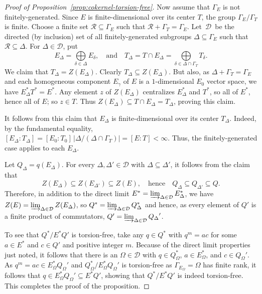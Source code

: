 \documentclass[11pt]{article}
\numberwithin{equation}{section}
\theoremstyle{plain}
\theoremstyle{remark}
\begin{document}
\begin{proof}[Proof of Proposition~\ref{prop:cokernel-torsion-free}]
Now assume that $\Gamma_E$ is not finitely-generated. Since $E$ is finite-dimensional over its center $T$, the group 
$\Gamma_E/\Gamma_T$ is finite.  Choose a finite set $\mathcal R\subseteq \Gamma_E$  such that 
$\mathcal R + \Gamma_T = \Gamma_E$.  Let~$\mathcal D$~be the directed  (by inclusion) set of all 
finitely-generated subgroups $\Delta\subseteq \Gamma_E$ such that $\mathcal R\subseteq \Delta$.  For 
$\Delta\in\mathcal D$, put
$$
        E_\Delta=\underset{\delta\in\Delta}{\textstyle{\bigoplus}} E_\delta,\quad\text{and}\quad
        T_\Delta=T\cap E_\Delta=\underset{\delta\in\Delta\cap\Gamma_T}{\textstyle{\bigoplus}} T_\delta.
$$
We claim that $T_\Delta = Z(E_\Delta)$.  Clearly $T_\Delta \subseteq  Z(E_\Delta)$.  But also, as 
$\Delta + \Gamma_T= \Gamma_E$ and each homogeneous component $E_\gamma$ of $E$ is a $1$-dimensional 
$E_0$ vector space, we have $E_\Delta^*T^* = E^*$.  Any element $z$ of $Z(E_\Delta)$ centralizes $E_\Delta^*$ and 
$T^*$, so all of $E^*$, hence all of $E$; so $z\in T$.  Thus $Z(E_\Delta) \subseteq T \cap E_\Delta = T_\Delta$, 
proving this claim.

It follows from this claim that $E_\Delta$ is finite-dimensional over its center $T_\Delta$.  Indeed, by the fundamental 
equality, $[E_\Delta:T_\Delta]=[E_0:T_0]\,|\Delta/(\Delta\cap\Gamma_T)| = [E:T]< \infty$.   Thus, the finitely-generated 
case applies to each $E_\Delta$.

Let $Q_\Delta = q(E_\Delta)$.   For every $\Delta, \Delta' \in \mathcal D$ with $\Delta \subseteq \Delta'$, it follows from 
the claim that 
$$
Z(E_\Delta) \subseteq Z(E_{\Delta'}) \subseteq Z(E), \quad \text{hence}
\quad  Q_\Delta \subseteq Q_{\Delta'} \subseteq Q.
$$
Therefore, in addition to the direct limit $E^* = \varinjlim_{\Delta\in\mathcal D} E_\Delta^*$, we have $Z(E)  = \varinjlim_{\Delta\in\mathcal D} Z(E_\Delta)$,  so 
${Q^* = \varinjlim_{\Delta\in\mathcal D} Q_\Delta^*}$ and hence, as every element of $Q'$ is a finite product of 
commutators, ${Q' = \varinjlim_{\Delta\in\mathcal D} {Q_\Delta}'}$.

To see that $Q^*/E^* Q'$ is torsion-free, take any $q \in Q^*$ with $q^m = a c$ for some $a\in E^*$ and $c\in Q'$ and 
positive integer $m$. Because of the direct limit properties just noted, it follows that there is an $\Omega \in \mathcal D$ 
with $q \in Q_\Omega^*$, $a\in E_\Omega^*$, and $c\in {Q_\Omega}'$.  As $q^m = ac \in E_\Omega^* {Q_\Omega}'$ 
and $Q_\Omega^*/E_\Omega^*{Q_\Omega}'$ is torsion-free as $\Gamma_{E_\Omega}=\Omega$ has finite rank, it 
follows that $q \in E_\Omega^*{Q_\Omega}' \subseteq E^*Q'$, showing that $Q^*/E^* Q'$ is indeed torsion-free.
This completes the proof of the proposition.
\end{proof}
\end{document}
